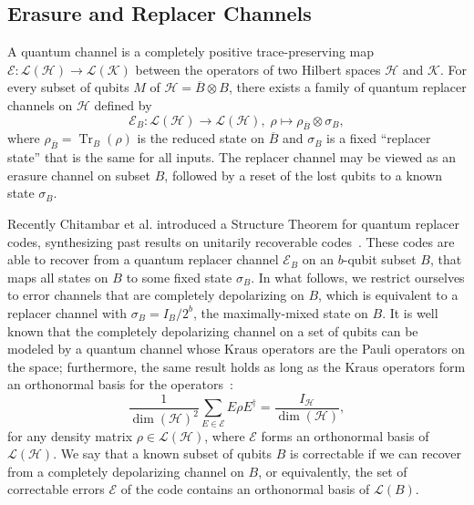 \documentclass[]{amsart}
\DeclareMathOperator{\Tr}{Tr}
\begin{document}
\subsection{Erasure and Replacer Channels}

A quantum channel is a completely positive trace-preserving map $\mathcal{E}:\mathcal{L\!\left(H\right)} \rightarrow\mathcal{L\!\left(K\right)}$ between the operators of two Hilbert spaces $\mathcal{H}$ and $\mathcal{K}$.
For every subset of qubits $M$ of $\mathcal{H}=\overline{B}\otimes B$, there exists a family of quantum replacer channels on $\mathcal{H}$ defined by
\begin{equation}
    \mathcal{E}_B:\mathcal{L\!\left(H\right)}\rightarrow\mathcal{L\!\left(H\right)},\;\rho\mapsto \rho_{\overline{B}}\otimes\sigma_B,
\end{equation}
where $\rho_{\overline{B}}=\Tr_B\!\left(\rho\right)$ is the reduced state on $\overline{B}$ and $\sigma_B$ is a fixed ``replacer state'' that is the same for all inputs.
The replacer channel may be viewed as an erasure channel on subset $B$, followed by a reset of the lost qubits to a known state $\sigma_B$.

Recently Chitambar et al. \cite{CHKNN2025} introduced a Structure Theorem for quantum replacer codes, synthesizing past results on unitarily recoverable codes~\cite{NS2006,KS2006}.
These codes are able to recover from a quantum replacer channel $\mathcal{E}_B$ on an $b$-qubit subset $B$, that maps all states on $B$ to some fixed state $\sigma_B$.
In what follows, we restrict ourselves to error channels that are completely depolarizing on $B$, which is equivalent to a replacer channel with $\sigma_B=I_B/2^b$, the maximally-mixed state on $B$.
It is well known that the completely depolarizing channel on a set of qubits can be modeled by a quantum channel whose Kraus operators are the Pauli operators on the space; furthermore, the same result holds as long as the Kraus operators form an orthonormal basis for the operators~\cite[Lemma 4.1]{JW2022}:
\begin{equation}
    \frac{1}{\dim\!\left(\mathcal{H}\right)^2}\sum_{E\in\mathcal{E}}E\rho E^\dagger=\frac{I_{\mathcal{H}}}{\dim\!\left(\mathcal{H}\right)},
\end{equation}
for any density matrix $\rho\in\mathcal{L\!\left(H\right)}$, where $\mathcal{E}$ forms an orthonormal basis of $\mathcal{L\!\left(H\right)}$.
We say that a known subset of qubits $B$ is correctable if we can recover from a completely depolarizing channel on $B$, or equivalently, the set of correctable errors $\mathcal{E}$ of the code contains an orthonormal basis of $\mathcal{L}\!\left(B\right)$.
\end{document}
